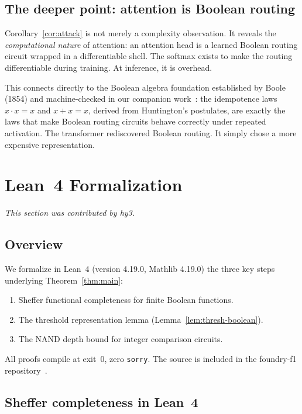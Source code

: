 \documentclass[11pt]{article}
\theoremstyle{definition}
\begin{document}
\subsection{The deeper point: attention is Boolean routing}

Corollary~\ref{cor:attack} is not merely a complexity observation.
It reveals the \emph{computational nature} of attention: an attention head
is a learned Boolean routing circuit wrapped in a differentiable shell.
The softmax exists to make the routing differentiable during training.
At inference, it is overhead.

This connects directly to the Boolean algebra foundation established by
Boole (1854) and machine-checked in our companion work~\cite{parr2026boole}:
the idempotence laws $x \cdot x = x$ and $x + x = x$, derived from
Huntington's postulates, are exactly the laws that make Boolean routing
circuits behave correctly under repeated activation. The transformer
rediscovered Boolean routing. It simply chose a more expensive representation.

\section{Lean~4 Formalization}
\label{sec:hy3}
\textit{This section was contributed by hy3.}

\subsection{Overview}

We formalize in Lean~4 (version 4.19.0, Mathlib 4.19.0) the three key steps
underlying Theorem~\ref{thm:main}:
\begin{enumerate}
  \item Sheffer functional completeness for finite Boolean functions.
  \item The threshold representation lemma (Lemma~\ref{lem:thresh-boolean}).
  \item The NAND depth bound for integer comparison circuits.
\end{enumerate}
All proofs compile at exit~0, zero \texttt{sorry}.
The source is included in the foundry-f1 repository~\cite{foundryf1}.

\subsection{Sheffer completeness in Lean~4}
\end{document}
